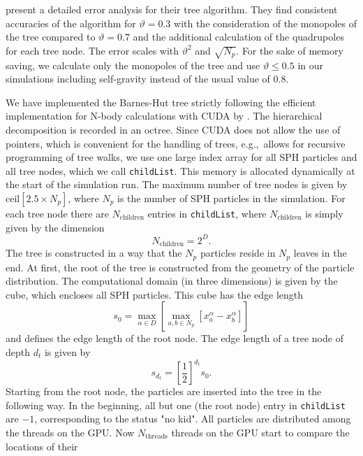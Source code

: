 \documentclass[10pt,fleqn,twoside]{article}
\begin{document}
\cite{1989ApJS...70..389B} present a detailed error analysis for their tree algorithm. They find consistent accuracies
of the algorithm for $\vartheta=0.3$  with the consideration of the monopoles of the tree compared to $\vartheta=0.7$
and the additional calculation of the quadrupoles for each tree node. The error scales with $\vartheta^2$ and $\sqrt{N_p}$. For the sake of memory saving, we calculate only the monopoles of the tree and use
$\vartheta \leq 0.5$ in our simulations including self-gravity instead of the usual value of $0.8$.
%


We have implemented the Barnes-Hut tree strictly following the efficient implementation for N-body calculations with
CUDA by \cite{burtscher:2011}. The hierarchical decomposition is recorded in an octree. Since CUDA does not allow the
use of pointers, which is convenient for the handling of trees, e.g.,\ allows for recursive programming of tree walks, we
use one large index array for all SPH particles and all tree nodes, which we call {\tt childList}. This memory is
allocated dynamically at the start of the simulation run. The maximum
number of tree nodes is given by $\mathrm{ceil}[2.5 \times N_p]$, where $N_p$ is the number of SPH particles in the
simulation. For each tree node there are $N_\mathrm{children}$ entries in {\tt childList}, where $N_\mathrm{children}$
is simply given by the dimension
\begin{equation}
N_\mathrm{children} = 2^D.
\end{equation}
The tree is constructed in a way that the $N_p$ particles reside in $N_p$ leaves in the end.
At first, the root of the tree is constructed from the geometry of the particle distribution. The computational domain
(in three dimensions) is given by the cube, which encloses all SPH particles. This cube has the edge length
\begin{equation}
s_0 = \max_{\alpha \in D}  \left[ \max_{a,b \in N_p} \left[ x_a^\alpha - x_b^\alpha \right] \right]
\end{equation}
and defines the edge length of the root node.
The edge length of a tree node of depth $d_t$ is given by
\begin{equation}
s_{d_t} = \left[ \frac{1}{2}\right]^{d_t} s_0.
\end{equation}
Starting from the root node, the particles are inserted into the tree in the following way. In the beginning, all but
one (the root node) entry in {\tt childList} are $-1$, corresponding to the status "no kid".  All particles are
distributed among the threads on the GPU.  Now $N_\mathrm{threads}$ threads on the GPU start to compare the locations of their
\end{document}
